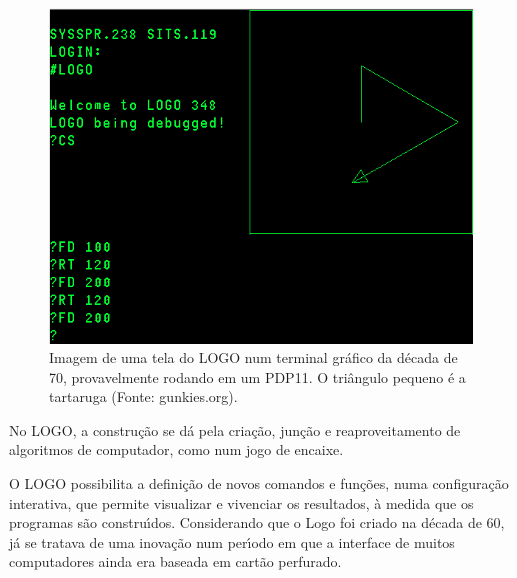 \documentclass[
12pt,		%
openright,	%
twoside,  %
a4paper,			%
chapter=TITLE,		%
english,			%
french,				%
spanish,			%
brazil				%
]{USPSC-classe/USPSC}
\begin{document}
\begin{figure}[max size={\textwidth}{\textheight}]
\begin{minipage}[b]{0.4\linewidth}
                \includegraphics[width=1.0\linewidth]{../../imagens/logo-PDP11.png}
                \caption{Imagem de uma tela do LOGO num terminal gr\'afico da d\'ecada de 70, provavelmente rodando em um PDP11. O tri\^angulo pequeno \'e a tartaruga (Fonte: gunkies.org).}
                \label{ca83b217b58f57e503ff496c6c6f47bee5dc77cd}
\end{minipage}
\hspace{0.5cm}
\end{figure}



No LOGO, a constru\c{c}\~ao se d\'a pela cria\c{c}\~ao, jun\c{c}\~ao e reaproveitamento de algoritmos de computador, como num jogo de encaixe.

















O LOGO possibilita a defini\c{c}\~ao de novos comandos e fun\c{c}\~oes, numa configura\c{c}\~ao interativa, que permite visualizar e vivenciar os resultados, \`a medida que os programas s\~ao constru\'{\i}dos. Considerando que o Logo foi criado na d\'ecada de 60, j\'a se tratava de uma inova\c{c}\~ao num per\'{\i}odo em que a interface de muitos computadores ainda era baseada em cart\~ao perfurado.
\end{document}
